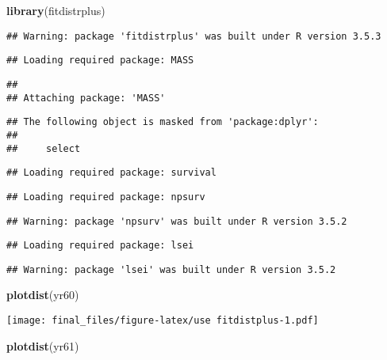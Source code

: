 \documentclass[]{article}
\newenvironment{Shaded}{\begin{snugshade}}{\end{snugshade}}
\newcommand{\KeywordTok}[1]{\textcolor[rgb]{0.13,0.29,0.53}{\textbf{#1}}}
\newcommand{\NormalTok}[1]{#1}
\begin{document}
\begin{Shaded}
\begin{Highlighting}[]
\KeywordTok{library}\NormalTok{(fitdistrplus)}
\end{Highlighting}
\end{Shaded}

\begin{verbatim}
## Warning: package 'fitdistrplus' was built under R version 3.5.3
\end{verbatim}

\begin{verbatim}
## Loading required package: MASS
\end{verbatim}

\begin{verbatim}
## 
## Attaching package: 'MASS'
\end{verbatim}

\begin{verbatim}
## The following object is masked from 'package:dplyr':
## 
##     select
\end{verbatim}

\begin{verbatim}
## Loading required package: survival
\end{verbatim}

\begin{verbatim}
## Loading required package: npsurv
\end{verbatim}

\begin{verbatim}
## Warning: package 'npsurv' was built under R version 3.5.2
\end{verbatim}

\begin{verbatim}
## Loading required package: lsei
\end{verbatim}

\begin{verbatim}
## Warning: package 'lsei' was built under R version 3.5.2
\end{verbatim}

\begin{Shaded}
\begin{Highlighting}[]
\KeywordTok{plotdist}\NormalTok{(yr60)}
\end{Highlighting}
\end{Shaded}

\texttt{[image: final\_files/figure-latex/use fitdistplus-1.pdf]}

\begin{Shaded}
\begin{Highlighting}[]
\KeywordTok{plotdist}\NormalTok{(yr61)}
\end{Highlighting}
\end{Shaded}
\end{document}
